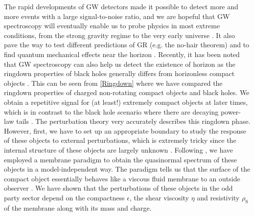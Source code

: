 \documentclass[aps,prd,twocolumn,floatfix,noshowpacs,tightenlines,noshowkeys,superscriptaddress,amsmath,amssymb,
nofootinbib]{revtex4-1}
\renewcommand\[{\begin{equation}}
\renewcommand\]{\end{equation}}
\begin{document}
 The rapid developments of GW detectors made it possible to detect more and more events with a large signal-to-noise ratio, and we are hopeful that GW spectroscopy will eventually enable us to probe physics in most extreme conditions,  from the strong gravity regime \cite{Berti:2015itd,TheLIGOScientific:2016src,Yunes:2016jcc} to the very early universe \cite{Bethke:2014oos,Boyle:2006zz}. It also pave the way to test different predictions of GR (e.g. the no-hair theorem)\cite{Cardoso:2016ryw} and to find quantum mechanical effects near the horizon \cite{Cardoso:2016rao,Barausse:2014tra,Dey:2020wzm,Basak:2020jzr}. Recently, it has been noted that GW spectroscopy can also help us detect the existence of horizon as the ringdown properties of black holes generally differs from horizonless compact objects \cite{Cardoso:2017cqb,Cardoso:2016oxy,Cardoso:2016rao,Cardoso:2019rvt,Maggio:2020jml, Mark:2017dnq, Micchi:2019yze,Micchi:2020gqy}. This can be seen from \autoref{Ringdown} where we have compared the ringdown properties of charged non-rotating compact objects and black holes. We obtain a repetitive signal for (at least!) extremely compact objects at later times, which is in contrast to the black hole scenario where there are decaying power-law tails \cite{PhysRevD.34.384,PhysRevD.49.883,PhysRevD.49.890,PhysRevLett.84.10}. The perturbation theory very accurately describes this ringdown phase. However, first, we have to set up an appropriate boundary to study the response of these objects to external perturbations, which is extremely tricky since the internal structure of these objects are largely unknown \cite{Mark:2017dnq, Micchi:2019yze,Micchi:2020gqy}. Following \cite{Maggio:2020jml}, we have employed a membrane paradigm to obtain the quasinormal spectrum of these objects in a model-independent way. The paradigm tells us that the surface of the compact object essentially behaves like a viscous fluid membrane to an outside observer \cite{1982mgm..conf..587D, Thorne, MacDonald:1982zz, PhysRevD.33.915}. We have shown that the perturbations of these objects in the odd party sector depend on the compactness $\epsilon$, the shear viscosity $\eta$ and resistivity $\rho_{\textrm{S}}$ of the membrane along with its mass and charge. \\
\end{document}
